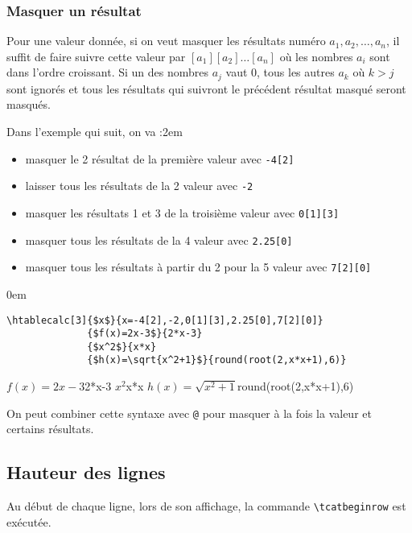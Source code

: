 \documentclass[a4paper,10pt]{article}
\newcommand\verbinline{\lstinline[breaklines=false,basicstyle=\normalsize\ttfamily]}
\newcommand\mywidth{0.85\linewidth}
\begin{document}
\subsubsection{Masquer un résultat}
Pour une valeur donnée, si on veut masquer les résultats numéro $a_1,a_2,\ldots,a_n$, il suffit de faire suivre cette valeur par $[a_1][a_2]\ldots[a_n]$ où les nombres $a_i$ sont dans l'ordre croissant. Si un des nombres $a_j$ vaut 0, tous les autres $a_k$ où $k>j$ sont ignorés et tous les résultats qui suivront le précédent résultat masqué seront masqués.\medskip

Dans l'exemple qui suit, on va :\parindent2em
\begin{itemize}
	\item masquer le 2\ieme{} résultat de la première valeur avec \og\verb|-4[2]|\fg
	\item laisser tous les résultats de la 2\ieme{} valeur avec \og\verb|-2|\fg
	\item masquer les résultats \no{} 1 et 3 de la troisième valeur avec \og\verb|0[1][3]|\fg
	\item masquer tous les résultats de la 4\ieme{} valeur avec \og\verb|2.25[0]|\fg
	\item masquer tous les résultats à partir du 2\ieme{} pour la 5\ieme{} valeur avec \og\verb|7[2][0]|\fg
\end{itemize}\parindent0em

\begin{center}
\begin{minipage}{\mywidth}
\begin{lstlisting}
\htablecalc[3]{$x$}{x=-4[2],-2,0[1][3],2.25[0],7[2][0]}
              {$f(x)=2x-3$}{2*x-3}
              {$x^2$}{x*x}
              {$h(x)=\sqrt{x^2+1}$}{round(root(2,x*x+1),6)}
\end{lstlisting}
\end{minipage}

              {$f(x)=2x-3$}{2*x-3}
              {$x^2$}{x*x}
              {$h(x)=\sqrt{x^2+1}$}{round(root(2,x*x+1),6)}
\end{center}
On peut combiner cette syntaxe avec \verb|@| pour masquer à la fois la valeur et certains résultats.

\subsection{Hauteur des lignes}
Au début de chaque ligne, lors de son affichage, la commande \verbinline|\tcatbeginrow| est exécutée.
\end{document}
